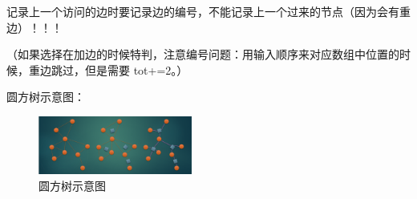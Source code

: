 记录上一个访问的边时要记录边的编号，不能记录上一个过来的节点（因为会有重边）！！！

（如果选择在加边的时候特判，注意编号问题：用输入顺序来对应数组中位置的时候，重边跳过，但是需要 tot+=2。）

圆方树示意图：

\begin{figure}[H]
    \centering
    \includegraphics[width=0.45\textwidth]{src/graph/tarjan-tree.png}
    \caption{圆方树示意图}
\end{figure}

\inputminted{cpp}{src/graph/tarjan.cpp}